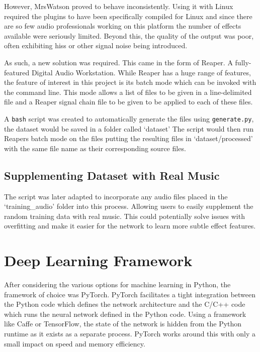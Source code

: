 \documentclass{l4proj}
\begin{document}
However, MrsWatson proved to behave inconsistently. Using it with Linux
required the plugins to have been specifically compiled for Linux and
since there are so few audio professionals working on this platform the
number of effects available were seriously limited. Beyond this, the
quality of the output was poor, often exhibiting hiss or other signal
noise being introduced.

As such, a new solution was required. This came in the form of Reaper. A
fully-featured Digital Audio Workstation. While Reaper has a huge range
of features, the feature of interest in this project is its batch mode
which can be invoked with the command line. This mode allows a list of
files to be given in a line-delimited file and a Reaper signal chain
file to be given to be applied to each of these files.

A \texttt{bash} script was created to automatically generate the files
using \texttt{generate.py}, the dataset would be saved in a folder
called `dataset' The script would then run Reapers batch mode on the
files putting the resulting files in `dataset/processed' with the same
file name as their corresponding source files.

\subsection{Supplementing Dataset with Real
Music}\label{supplementing-dataset-with-real-music}

The script was later adapted to incorporate any audio files placed in
the `training\_audio' folder into this process. Allowing users to easily
supplement the random training data with real music. This could
potentially solve issues with overfitting and make it easier for the
network to learn more subtle effect features.

\section{Deep Learning Framework}\label{deep-learning-framework}

After considering the various options for machine learning in Python,
the framework of choice was PyTorch. PyTorch facilitates a tight
integration between the Python code which defines the network
architecture and the C/C++ code which runs the neural network defined in
the Python code. Using a framework like Caffe or TensorFlow, the state
of the network is hidden from the Python runtime as it exists as a
separate process. PyTorch works around this with only a small impact on
speed and memory efficiency.
\end{document}
